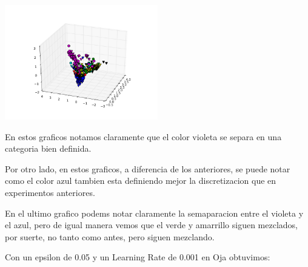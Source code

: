 \includegraphics[width=0.5\textwidth]{img/ej1_sanger_005_200}


En estos graficos notamos claramente que el color violeta se separa en una categoria bien definida. 

Por otro lado, en estos graficos, a diferencia de los anteriores, se puede notar como el color azul tambien esta definiendo mejor la discretizacion que en experimentos anteriores.

En el ultimo grafico podems notar claramente la semaparacion entre el violeta y el azul, pero de igual manera vemos que el verde y amarrillo siguen mezclados, por suerte, no tanto como antes, pero siguen mezclando.

Con un epsilon de 0.05 y un Learning Rate de 0.001 en Oja obtuvimos:

